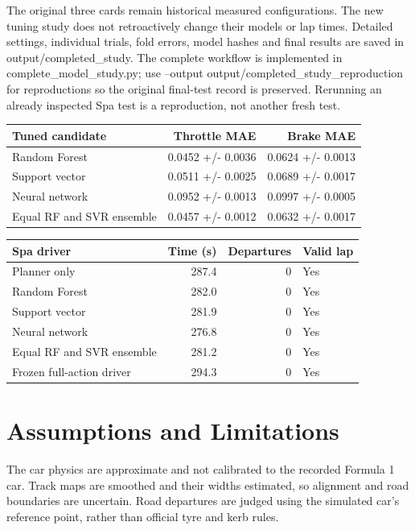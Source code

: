 \documentclass[11pt,a4paper]{article}
\begin{document}
The original three cards remain historical measured configurations. The new tuning study does not retroactively change their models or lap times. Detailed settings, individual trials, fold errors, model hashes and final results are saved in output/completed\_study. The complete workflow is implemented in complete\_model\_study.py; use --output output/completed\_study\_reproduction for reproductions so the original final-test record is preserved. Rerunning an already inspected Spa test is a reproduction, not another fresh test.
\begin{center}\small\begin{tabular}{lrr}\toprule Tuned candidate & Throttle MAE & Brake MAE\\\midrule
Random Forest & 0.0452 +/- 0.0036 & 0.0624 +/- 0.0013\\
Support vector & 0.0511 +/- 0.0025 & 0.0689 +/- 0.0017\\
Neural network & 0.0952 +/- 0.0013 & 0.0997 +/- 0.0005\\
Equal RF and SVR ensemble & 0.0457 +/- 0.0012 & 0.0632 +/- 0.0017\\
\bottomrule\end{tabular}\end{center}
\begin{center}\small\begin{tabular}{lrrl}\toprule Spa driver & Time (s) & Departures & Valid lap\\\midrule
Planner only & 287.4 & 0 & Yes\\
Random Forest & 282.0 & 0 & Yes\\
Support vector & 281.9 & 0 & Yes\\
Neural network & 276.8 & 0 & Yes\\
Equal RF and SVR ensemble & 281.2 & 0 & Yes\\
Frozen full-action driver & 294.3 & 0 & Yes\\
\bottomrule\end{tabular}\end{center}
\section{Assumptions and Limitations}
The car physics are approximate and not calibrated to the recorded Formula 1 car. Track maps are smoothed and their widths estimated, so alignment and road boundaries are uncertain. Road departures are judged using the simulated car's reference point, rather than official tyre and kerb rules.
\end{document}
